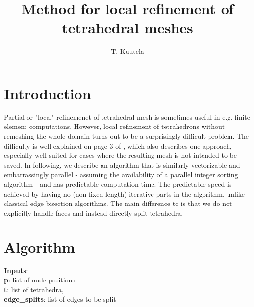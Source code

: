 \documentclass{article}
\title{Method for local refinement of tetrahedral meshes}
\author{T. Kuutela\footnotemark[1]
}
\begin{document}
	\maketitle

	\renewcommand{\thefootnote}{\fnsymbol{footnote}}


	\section{Introduction}
	Partial or "local" refinemenet of tetrahedral mesh is sometimes useful in e.g. finite element computations. However, local refinement of tetrahedrons without remeshing the whole domain turns out to be a surprisingly difficult problem. The difficulty is well explained on page 3 of \cite{embarrassinglyparallel}, which also describes one approach, especially well suited for cases where the resulting mesh is not intended to be saved. In following, we describe an algorithm that is similarly vectorizable and embarrassingly parallel - assuming the availability of a parallel integer sorting algorithm - and has predictable computation time. The predictable speed is achieved by having no (non-fixed-length) iterative parts in the algorithm, unlike classical edge bisection algorithms. The main difference to \cite{embarrassinglyparallel} is that we do not explicitly handle faces and instead directly split tetrahedra.

	\pagebreak

	\section{Algorithm}

	\textbf{Inputs}: \\
	\indent\textbf{p}: list of node positions, \\
	\indent\textbf{t}: list of tetrahedra, \\
	\indent\textbf{edge\_splits}: list of edges to be split
	\vspace{0.5cm}
\end{document}
